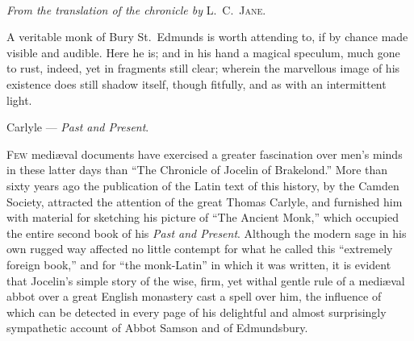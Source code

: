 \documentclass[10pt]{book}
\begin{document}
{\begin{center}
{\fontsize{13}{13} \selectfont
{}\\}
\vspace{.2cm}
\emph{From the translation of the chronicle by} \textsc{L.\ C.\ Jane.}
\end{center}


\begin{center}
\hspace{0cm}\vspace{-0.7cm}

\parbox{8.75cm}{
{\fontsize{9.5}{9.5} \selectfont
{}A veritable monk of Bury St.\ Edmunds is worth attending to, if by chance made visible and audible. Here he is; and in his hand a magical speculum, much gone to rust, indeed, yet in fragments still clear; wherein the marvellous image of his existence does still shadow itself, though fitfully, and as with an intermittent light.\linebreak{}
}

\hspace{0pt}\hfill Carlyle --- \emph{Past and Present}.
}

\end{center}

\vspace{.3cm}

{

{\setlength{\parskip}{0.0\baselineskip}\setlength{\parindent}{10pt}

\lettrine[lines=4]{\color{BrickRed}F}{ew} medi\ae{}val documents have exercised a greater fascination over men's minds in these latter days than ``The Chronicle of Jocelin of Brakelond.'' More than sixty years ago the publication of the Latin text of this history, by the Camden Society, attracted the attention of the great Thomas Carlyle, and furnished him with material for sketching his picture of ``The Ancient Monk,'' which occupied the entire second book of his \emph{Past and Present}. Although the modern sage in his own rugged way affected no little contempt for what he called this ``extremely foreign book,'' and for ``the monk-Latin'' in which it was written, it is evident that Jocelin's simple story of the wise, firm, yet withal gentle rule of a medi\ae{}val abbot over a great English monastery cast a spell over him, the influence of which can be detected in every page of his delightful and almost surprisingly sympathetic account of Abbot Samson and of Edmundsbury.

}}}
\end{document}
